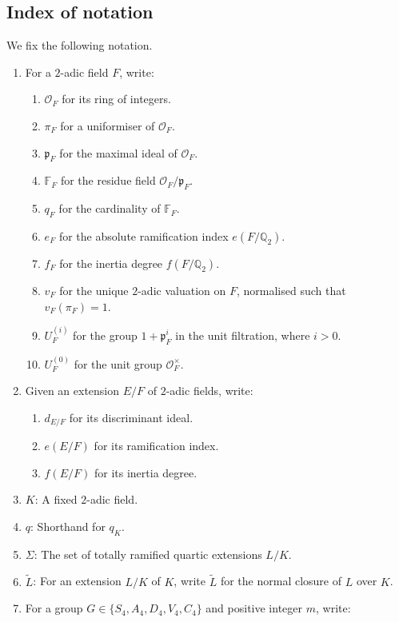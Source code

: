 \documentclass[11pt]{amsart}
\theoremstyle{theorem}
\theoremstyle{example}
\theoremstyle{definition}
\numberwithin{theorem}{section}
\numberwithin{theorem}{section}
\newcommand{\co}{\mathcal{O}}
\newcommand{\Q}{\mathbb{Q}}
\newcommand{\F}{\mathbb{F}}
\newcommand{\p}{\mathfrak{p}}
\begin{document}
\subsection{Index of notation}
We fix the following notation. 
\begin{enumerate}
    \item For a $2$-adic field $F$, write:
    \begin{enumerate}
        \item $\co_F$ for its ring of integers.
        \item $\pi_F$ for a uniformiser of $\co_F$. 
        \item $\p_F$ for the maximal ideal of $\co_F$. 
        \item $\F_F$ for the residue field $\co_F/\p_F$.
        \item $q_F$ for the cardinality of $\F_F$.
        \item $e_F$ for the absolute ramification index $e(F/\Q_2)$.
        \item $f_F$ for the inertia degree $f(F/\Q_2)$.
        \item $v_F$ for the unique $2$-adic valuation on $F$, normalised such that $v_F(\pi_F) = 1$.
        \item $U_F^{(i)}$ for the group $1 + \p_F^i$ in the unit filtration, where $i > 0$. 
        \item $U_F^{(0)}$ for the unit group $\co_F^\times$. 
    \end{enumerate}
    \item Given an extension $E/F$ of $2$-adic fields, write: 
    \begin{enumerate}
        \item $d_{E/F}$ for its discriminant ideal.
        \item $e(E/F)$ for its ramification index. 
        \item $f(E/F)$ for its inertia degree. 
    \end{enumerate}
    \item $K$: A fixed $2$-adic field.
    \item $q$: Shorthand for $q_K$. 
    \item $\Sigma$: The set of totally ramified quartic extensions $L/K$.
    \item $\widetilde{L}$: For an extension $L/K$ of $K$, write $\widetilde{L}$ for the normal closure of $L$ over $K$. 
    \item For a group $G \in \{S_4, A_4, D_4, V_4, C_4\}$ and positive integer $m$, write:
    \begin{enumerate}

\end{enumerate}
\end{enumerate}
\end{document}
